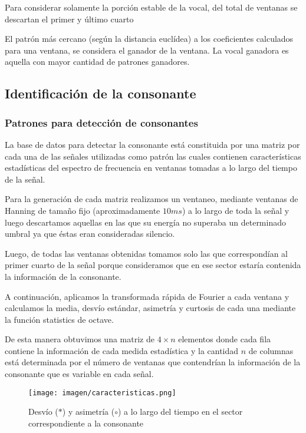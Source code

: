 \documentclass[conference,a4paper,10pt,oneside,final]{tfmpd}
\begin{document}
		Para considerar solamente la porción estable de la vocal,
		del total de ventanas se descartan el primer y último cuarto


		El patrón más cercano (según la distancia euclídea) a los coeficientes
		calculados para una ventana, se considera el ganador de la ventana.
		La vocal ganadora es aquella con mayor cantidad de patrones ganadores.

	\subsection{Identificación de la consonante}
	\subsubsection{Patrones para detección de consonantes}

		La base de datos para detectar la consonante está constituida por una
		matriz por cada una de las señales utilizadas como patrón las cuales
		contienen características estadísticas del espectro de frecuencia en
		ventanas tomadas a lo largo del tiempo de la señal.

		Para la  generación de cada matriz realizamos un ventaneo, mediante
		ventanas de Hanning de tamaño fijo (aproximadamente $10 ms$) a lo largo
		de toda la señal y luego descartamos aquellas en las que su energía no
		superaba un determinado umbral ya que éstas eran consideradas silencio.

		Luego, de todas las ventanas obtenidas tomamos solo las que correspondían
		al primer cuarto de la señal porque consideramos que en ese sector
		estaría contenida la información de la consonante.

		A continuación, aplicamos la transformada rápida de Fourier a cada
		ventana y calculamos la media, desvío estándar, asimetría y curtosis
		de cada una mediante la función statistics de octave.

		De esta manera obtuvimos una matriz de $4 \times n$ elementos donde cada fila
		contiene la información de cada medida estadística y la cantidad $n$
		de columnas está determinada por el número de ventanas que contendrían
		la información de la consonante que es variable en cada señal.

		
		\begin{figure}
			\texttt{[image: imagen/caracteristicas.png]}
			\caption{
				Desvío ($*$) y asimetría ($\circ$) a lo largo del tiempo
				en el sector correspondiente a la consonante
			}
			\label{fig:tracto}
		\end{figure}
\end{document}
